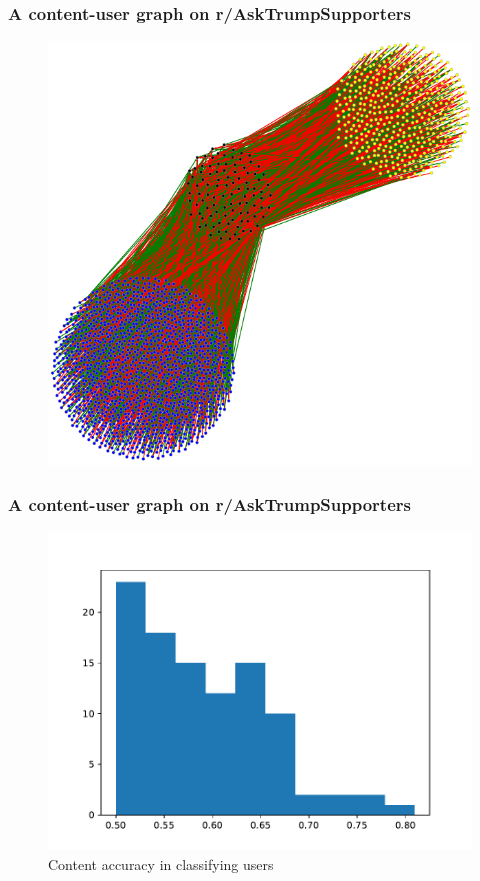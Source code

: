 \documentclass{beamer}
\begin{document}
\begin{frame}[c]
    \frametitle{A content-user graph on r/AskTrumpSupporters}
    \begin{figure}[htpb]
        \centering
        \includegraphics[width=0.8\linewidth]{img/exp-graph.png}
    \end{figure}
\end{frame}

\begin{frame}[c]
    \frametitle{A content-user graph on r/AskTrumpSupporters}
    \begin{figure}[htpb]
        \centering
        \includegraphics[width=0.8\linewidth]{out/experimental200/experimental200-accuracy-hist.pdf}
        \caption{Content accuracy in classifying users}%
        \label{fig:out/experimental200/experimental200-accuracy-hist}
    \end{figure}
\end{frame}
\end{document}
